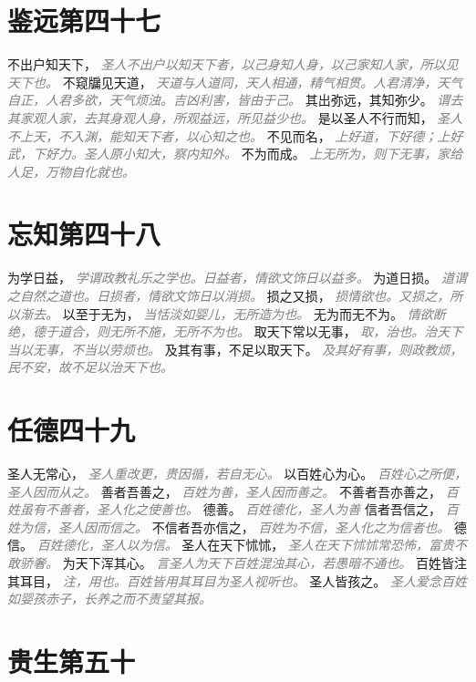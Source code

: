 \documentclass[a4paper,zihao=-4,oneside,landscape,UTF8]{ctexart}
\newcommand{\zhushi}[1]{\scriptsize{\textit{\textcolor{gray}{#1}}}\normalsize}
\begin{document}
\section{鉴远第四十七}

不出户知天下，
\zhushi{圣人不出户以知天下者，以己身知人身，以己家知人家，所以见天下也。}
不窥牖见天道，
\zhushi{天道与人道同，天人相通，精气相贯。人君清净，天气自正，人君多欲，天气烦浊。吉凶利害，皆由于己。}
其出弥远，其知弥少。
\zhushi{谓去其家观人家，去其身观人身，所观益远，所见益少也。}
是以圣人不行而知，
\zhushi{圣人不上天，不入渊，能知天下者，以心知之也。}
不见而名，
\zhushi{上好道，下好德；上好武，下好力。圣人原小知大，察内知外。}
不为而成。
\zhushi{上无所为，则下无事，家给人足，万物自化就也。}


\section{忘知第四十八}

为学日益，
\zhushi{学谓政教礼乐之学也。日益者，情欲文饰日以益多。}
为道日损。
\zhushi{道谓之自然之道也。日损者，情欲文饰日以消损。}
损之又损，
\zhushi{损情欲也。又损之，所以渐去。}
以至于无为，
\zhushi{当恬淡如婴儿，无所造为也。}
无为而无不为。
\zhushi{情欲断绝，德于道合，则无所不施，无所不为也。}
取天下常以无事，
\zhushi{取，治也。治天下当以无事，不当以劳烦也。}
及其有事，不足以取天下。
\zhushi{及其好有事，则政教烦，民不安，故不足以治天下也。}


\section{任德四十九}

圣人无常心，
\zhushi{圣人重改更，贵因循，若自无心。}
以百姓心为心。
\zhushi{百姓心之所便，圣人因而从之。}
善者吾善之，
\zhushi{百姓为善，圣人因而善之。}
不善者吾亦善之，
\zhushi{百姓虽有不善者，圣人化之使善也。}
德善。
\zhushi{百姓德化，圣人为善}
信者吾信之，
\zhushi{百姓为信，圣人因而信之。}
不信者吾亦信之，
\zhushi{百姓为不信，圣人化之为信者也。}
德信。
\zhushi{百姓德化，圣人以为信。}
圣人在天下怵怵，
\zhushi{圣人在天下怵怵常恐怖，富贵不敢骄奢。}
为天下浑其心。
\zhushi{言圣人为天下百姓混浊其心，若愚暗不通也。}
百姓皆注其耳目，
\zhushi{注，用也。百姓皆用其耳目为圣人视听也。}
圣人皆孩之。
\zhushi{圣人爱念百姓如婴孩赤子，长养之而不责望其报。}


\section{贵生第五十}
\end{document}
